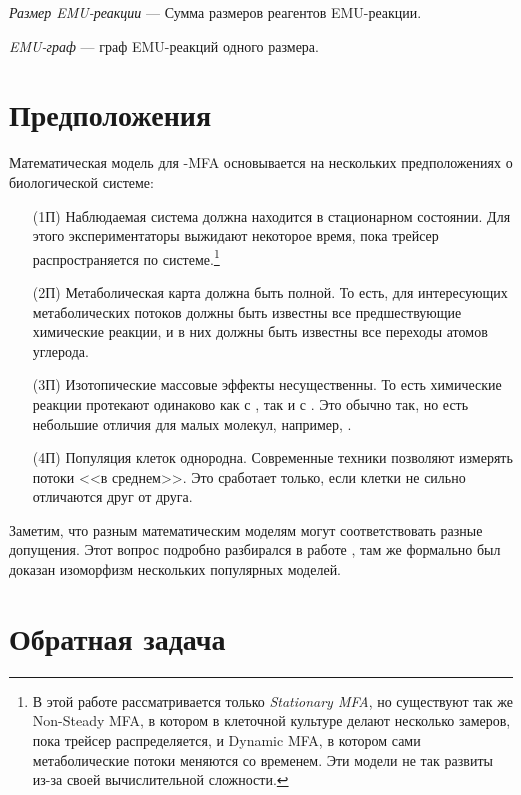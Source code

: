 \documentclass[14pt, a4paper]{extreport}
\begin{document}
\emph{Размер EMU-реакции} --- Сумма размеров реагентов EMU-реакции.

\emph{EMU-граф} --- граф EMU-реакций одного размера.



\clearpage

\section{Предположения}
Математическая модель для -MFA основывается на нескольких предположениях о биологической системе\cite{Wiechert_1997_1}:
\begin{enumerate}
	\item[(1П)] Наблюдаемая система должна находится в стационарном состоянии. Для этого экспериментаторы выжидают некоторое время, пока трейсер распространяется по системе.\footnote{В этой работе рассматривается только \emph{Stationary MFA}, но существуют так же Non-Steady MFA\cite{NMFA}, в котором в клеточной культуре делают несколько замеров, пока трейсер распределяется, и Dynamic MFA\cite{DMFA}, в котором сами метаболические потоки меняются со временем. Эти модели не так развиты из-за своей вычислительной сложности.}
	
	\item[(2П)] Метаболическая карта должна быть полной. То есть, для интересующих метаболических потоков должны быть известны все предшествующие химические реакции, и в них должны быть известны все переходы атомов углерода.
	
	\item[(3П)] Изотопические массовые эффекты несущественны. То есть химические реакции протекают одинаково как с , так и с . Это обычно так, но есть небольшие отличия для малых молекул, например, .
	
	\item[(4П)] Популяция клеток однородна. Современные техники позволяют измерять потоки <<в среднем>>. Это сработает только, если клетки не сильно отличаются друг от друга.
\end{enumerate}

Заметим, что разным математическим моделям могут соответствовать разные допущения. Этот вопрос подробно разбирался в работе \cite{formalizm_2017}, там же формально был доказан изоморфизм нескольких популярных моделей.
\clearpage


\section{Обратная задача}
\end{document}
